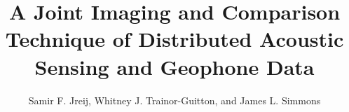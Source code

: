 \title{A Joint Imaging and Comparison Technique of Distributed Acoustic Sensing and Geophone Data}

\address{Colorado School of Mines, \\ 1500 Illinois Ave, \\ Golden, CO, 80401}

\author{Samir F. Jreij, Whitney J. Trainor-Guitton, and James L. Simmons}



\maketitle









